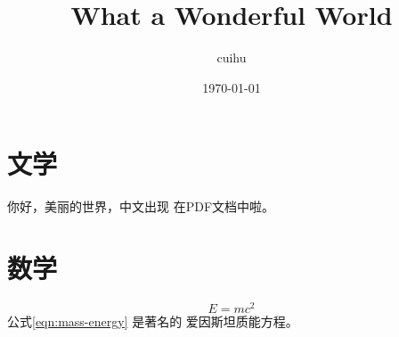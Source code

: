 \documentclass[UTF8]{ctexart}
\title{What a Wonderful World}
\author{cuihu}
\date{\today}
\begin{document}
	\maketitle
		\section{文学}
		你好，美丽的世界，中文出现
		在PDF文档中啦。
		
		\section{数学}
		\begin{equation}
			E=mc^2 \label{eqn:mass-energy}
		\end{equation}
		公式\ref{eqn:mass-energy} 是著名的
		爱因斯坦质能方程。		
	
\end{document}
